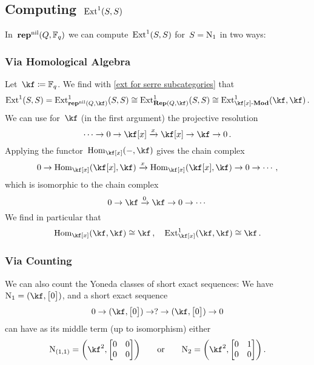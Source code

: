 \documentclass[a4paper,11pt]{scrartcl}
\begin{document}
\subsection{Computing~$\operatorname{Ext}^1(S,S)$}
\label{computing ext}

In~$\mathbf{rep}^{\mathrm{nil}}(Q, \mathbb{F}_q)$ we can compute~$\operatorname{Ext}^1(S,S)$ for~$S = \mathrm{N}_1$ in two ways:

\subsubsection{Via Homological Algebra}

Let~$\kf \defined \Finite_q$.
We find with \cref{ext for serre subcategories} that
\[
  \Ext^1(S,S)
  =
  \Ext^1_{\repnil(Q, \kf)}(S,S)
  \cong
  \Ext^1_{\Rep(Q, \kf)}(S, S)
  \cong
  \Ext^1_{\Mod{\kf[x]}}( \kf, \kf ) \,.
\]
We can use for~$\kf$ (in the first argument) the projective resolution
\[
  \dotsb
  \to
  0
  \to
  \kf[x]
  \xto{x}
  \kf[x]
  \to
  \kf
  \to
  0 \,.
\]
Applying the functor~$\Hom_{\kf[x]}(-, \kf)$ gives the chain complex
\[
  0
  \to
  \Hom_{\kf[x]}( \kf[x], \kf )
  \xto{x}
  \Hom_{\kf[x]}( \kf[x], \kf )
  \to
  0
  \to
  \dotsb \,,
\]
which is isomorphic to the chain complex
\[
  0
  \to
  \kf
  \xto{0}
  \kf
  \to
  0
  \to
  \dotsb
\]
We find in particular that
\[
  \Hom_{\kf[x]}(\kf, \kf) \cong \kf \,,
  \quad
  \Ext^1_{\kf[x]}(\kf, \kf) \cong \kf \,.
\]

\subsubsection{Via Counting}

We can also count the Yoneda classes of short exact sequences:
We have~$\Nil_1 = (\kf, \begin{bmatrix} 0 \end{bmatrix})$, and a short exact sequence
\[
  0
  \to
  (\kf, \begin{bmatrix} 0 \end{bmatrix})
  \to
  ?
  \to
  (\kf, \begin{bmatrix} 0 \end{bmatrix})
  \to
  0
\]
can have as its middle term (up to isomorphism) either
\[
  \Nil_{(1,1)}
  =
  \biggl( \kf^2, \begin{bmatrix} 0 & 0 \\ 0 & 0 \end{bmatrix} \biggr)
  \qquad\text{or}\qquad
  \Nil_2
  =
  \biggl( \kf^2, \begin{bmatrix} 0 & 1 \\ 0 & 0 \end{bmatrix} \biggr) \,.
\]
\end{document}
